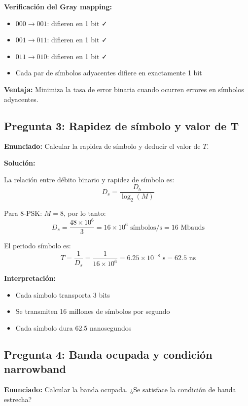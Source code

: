 \documentclass[11pt,a4paper]{article}
\begin{document}
\textbf{Verificaci\'on del Gray mapping:}
\begin{itemize}
    \item $000 \rightarrow 001$: difieren en 1 bit ✓
    \item $001 \rightarrow 011$: difieren en 1 bit ✓
    \item $011 \rightarrow 010$: difieren en 1 bit ✓
    \item Cada par de s\'imbolos adyacentes difiere en exactamente 1 bit
\end{itemize}

\textbf{Ventaja:} Minimiza la tasa de error binaria cuando ocurren errores en s\'imbolos adyacentes.



\subsection*{Pregunta 3: Rapidez de s\'imbolo y valor de T}

\textbf{Enunciado:} Calcular la rapidez de s\'imbolo y deducir el valor de $T$.

\vspace{0.3cm}
\textbf{Soluci\'on:}

La relaci\'on entre d\'ebito binario y rapidez de s\'imbolo es:
\[
D_s = \frac{D_b}{\log_2(M)}
\]

Para 8-PSK: $M = 8$, por lo tanto:
\[
D_s = \frac{48 \times 10^6}{3} = \boxed{16 \times 10^6 \text{ s\'imbolos/s} = 16 \text{ Mbauds}}
\]

El periodo s\'imbolo es:
\[
T = \frac{1}{D_s} = \frac{1}{16 \times 10^6} = \boxed{6.25 \times 10^{-8} \text{ s} = 62.5 \text{ ns}}
\]

\textbf{Interpretaci\'on:}
\begin{itemize}
    \item Cada s\'imbolo transporta 3 bits
    \item Se transmiten 16 millones de s\'imbolos por segundo
    \item Cada s\'imbolo dura 62.5 nanosegundos
\end{itemize}



\subsection*{Pregunta 4: Banda ocupada y condici\'on narrowband}

\textbf{Enunciado:} Calcular la banda ocupada. ¿Se satisface la condici\'on de banda estrecha?
\end{document}
